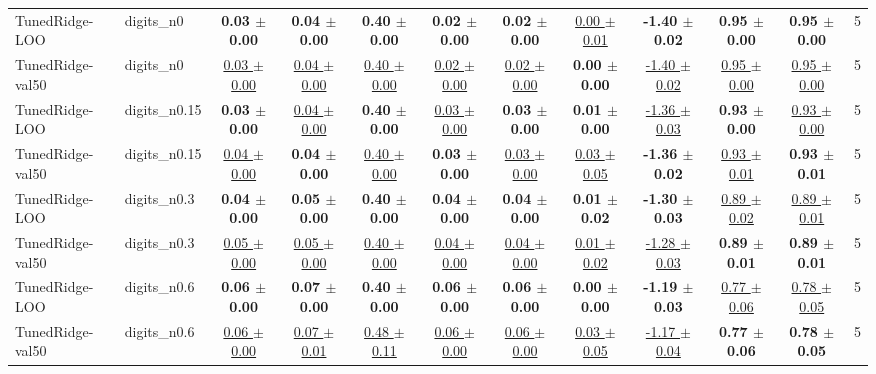 \begin{tabular}{llcccccccccc}
\midrule
TunedRidge-LOO & digits\_n0 & \textbf{0.03 $\pm$ 0.00} & \textbf{0.04 $\pm$ 0.00} & \textbf{0.40 $\pm$ 0.00} & \textbf{0.02 $\pm$ 0.00} & \textbf{0.02 $\pm$ 0.00} & \underline{0.00 $\pm$ 0.01} & \textbf{-1.40 $\pm$ 0.02} & \textbf{0.95 $\pm$ 0.00} & \textbf{0.95 $\pm$ 0.00} & 5 \\
TunedRidge-val50 & digits\_n0 & \underline{0.03 $\pm$ 0.00} & \underline{0.04 $\pm$ 0.00} & \underline{0.40 $\pm$ 0.00} & \underline{0.02 $\pm$ 0.00} & \underline{0.02 $\pm$ 0.00} & \textbf{0.00 $\pm$ 0.00} & \underline{-1.40 $\pm$ 0.02} & \underline{0.95 $\pm$ 0.00} & \underline{0.95 $\pm$ 0.00} & 5 \\
\midrule
TunedRidge-LOO & digits\_n0.15 & \textbf{0.03 $\pm$ 0.00} & \underline{0.04 $\pm$ 0.00} & \textbf{0.40 $\pm$ 0.00} & \underline{0.03 $\pm$ 0.00} & \textbf{0.03 $\pm$ 0.00} & \textbf{0.01 $\pm$ 0.00} & \underline{-1.36 $\pm$ 0.03} & \textbf{0.93 $\pm$ 0.00} & \underline{0.93 $\pm$ 0.00} & 5 \\
TunedRidge-val50 & digits\_n0.15 & \underline{0.04 $\pm$ 0.00} & \textbf{0.04 $\pm$ 0.00} & \underline{0.40 $\pm$ 0.00} & \textbf{0.03 $\pm$ 0.00} & \underline{0.03 $\pm$ 0.00} & \underline{0.03 $\pm$ 0.05} & \textbf{-1.36 $\pm$ 0.02} & \underline{0.93 $\pm$ 0.01} & \textbf{0.93 $\pm$ 0.01} & 5 \\
\midrule
TunedRidge-LOO & digits\_n0.3 & \textbf{0.04 $\pm$ 0.00} & \textbf{0.05 $\pm$ 0.00} & \textbf{0.40 $\pm$ 0.00} & \textbf{0.04 $\pm$ 0.00} & \textbf{0.04 $\pm$ 0.00} & \textbf{0.01 $\pm$ 0.02} & \textbf{-1.30 $\pm$ 0.03} & \underline{0.89 $\pm$ 0.02} & \underline{0.89 $\pm$ 0.01} & 5 \\
TunedRidge-val50 & digits\_n0.3 & \underline{0.05 $\pm$ 0.00} & \underline{0.05 $\pm$ 0.00} & \underline{0.40 $\pm$ 0.00} & \underline{0.04 $\pm$ 0.00} & \underline{0.04 $\pm$ 0.00} & \underline{0.01 $\pm$ 0.02} & \underline{-1.28 $\pm$ 0.03} & \textbf{0.89 $\pm$ 0.01} & \textbf{0.89 $\pm$ 0.01} & 5 \\
\midrule
TunedRidge-LOO & digits\_n0.6 & \textbf{0.06 $\pm$ 0.00} & \textbf{0.07 $\pm$ 0.00} & \textbf{0.40 $\pm$ 0.00} & \textbf{0.06 $\pm$ 0.00} & \textbf{0.06 $\pm$ 0.00} & \textbf{0.00 $\pm$ 0.00} & \textbf{-1.19 $\pm$ 0.03} & \underline{0.77 $\pm$ 0.06} & \underline{0.78 $\pm$ 0.05} & 5 \\
TunedRidge-val50 & digits\_n0.6 & \underline{0.06 $\pm$ 0.00} & \underline{0.07 $\pm$ 0.01} & \underline{0.48 $\pm$ 0.11} & \underline{0.06 $\pm$ 0.00} & \underline{0.06 $\pm$ 0.00} & \underline{0.03 $\pm$ 0.05} & \underline{-1.17 $\pm$ 0.04} & \textbf{0.77 $\pm$ 0.06} & \textbf{0.78 $\pm$ 0.05} & 5 \\
\bottomrule
\end{tabular}
